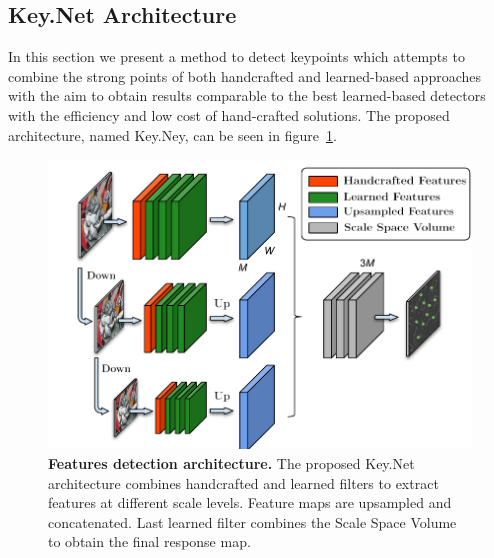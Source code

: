 
\newpage
\subsection{Key.Net Architecture}
\label{keynet_sec:architecture}

In this section we present a method to detect keypoints which attempts to combine the strong points of both handcrafted and learned-based approaches with the aim to obtain results comparable to the best learned-based detectors with the efficiency and low cost of hand-crafted solutions. The proposed architecture, named Key.Ney, can be seen in figure~\ref{keynet_fig:net_architecture}.


\begin{figure}
\centering
\hspace*{-1cm}    
\includegraphics[width=\linewidth]{main/chapter02/figures/keynet_inference.pdf}
\vspace{-0.20cm}
\caption[Features detection architecture]{\textbf{Features detection architecture.} The proposed Key.Net architecture combines handcrafted and learned filters to extract features at different scale levels. Feature maps are upsampled and concatenated. Last learned filter combines the Scale Space Volume to obtain the final response map.}
\label{keynet_fig:net_architecture}
\end{figure}

